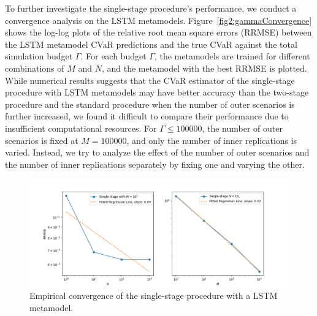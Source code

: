 To further investigate the single-stage procedure's performance, we conduct a convergence analysis on the LSTM metamodels.
Figure~\ref{fig2:gammaConvergence} shows the log-log plots of the relative root mean square errors (RRMSE) between the LSTM metamodel CVaR predictions and the true CVaR against the total simulation budget $\Gamma$.
For each budget $\Gamma$, the metamodels are trained for different combinations of $M$ and $N$, and the metamodel with the best RRMSE is plotted.
While numerical results suggests that the CVaR estimator of the single-stage procedure with LSTM metamodels may have better accuracy than the two-stage procedure and the standard procedure when the number of outer scenarios is further increased, we found it difficult to compare their performance due to insufficient computational resources.
For $\Gamma \leq \num{100000}$, the number of outer scenarios is fixed at $M = \num{100000}$, and only the number of inner replications is varied.
Instead, we try to analyze the effect of the number of outer scenarios and the number of inner replications separately by fixing one and varying the other.

\begin{figure}[ht!]
    \centering
    \includegraphics[width=\textwidth]{./project2/figures/singleStage/MSEConvergence_lstmLoCap_MN.png}
    \caption{Empirical convergence of the single-stage procedure with a LSTM metamodel.} 
    \label{fig2:mnConvergence}
\end{figure}

